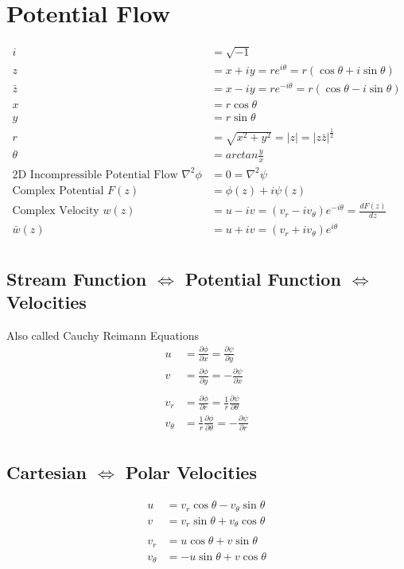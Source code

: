 \documentclass[10pt, letterpaper, notitlepage, landscape]{article}
\begin{document}
\section{Potential Flow}
\begin{align*}
i &= \sqrt{-1} \\
z &= x + i y = r e^{i \theta} = r (\cos{\theta} + i \sin{\theta}) \\
\bar{z} &= x - i y = r e^{-i \theta} = r (\cos{\theta} - i \sin{\theta}) \\
x &= r \cos{\theta} \\
y &= r \sin{\theta} \\
r &= \sqrt{x^2 + y^2} = |z| = |z \bar{z}|^{\frac{1}{2}} \\
\theta &= arctan{\frac{y}{x}} \\
\text{2D Incompressible Potential Flow } \nabla^2 \phi &= 0 = \nabla^2 \psi \\
\text{Complex Potential\ } F(z) &= \phi(z) + i \psi(z) \\
\text{Complex Velocity\ } w(z) &= u - i v = (v_r - i v_{\theta}) e^{-i \theta} = \frac{dF(z)}{dz} \\
\bar{w}(z) &= u + i v = (v_r + i v_{\theta}) e^{i \theta} \\
\end{align*}


\subsection{Stream Function $\Leftrightarrow$ Potential Function $\Leftrightarrow$ Velocities}
Also called Cauchy Reimann Equations
\begin{align*}
u &= \frac{\partial \phi}{\partial x} = \frac{\partial \psi}{\partial y} \\
v &= \frac{\partial \phi}{\partial y} = -\frac{\partial \psi}{\partial x} \\ \\
v_r &= \frac{\partial \phi}{\partial r} = \frac{1}{r} \frac{\partial \psi}{\partial \theta} \\
v_{\theta} &= \frac{1}{r} \frac{\partial \phi}{\partial \theta} = -\frac{\partial \psi}{\partial r} \\
\end{align*}

\subsection{Cartesian $\Leftrightarrow$ Polar Velocities}
\begin{align*}
u &= v_r \cos{\theta} - v_{\theta} \sin{\theta} \\
v &= v_r \sin{\theta} + v_{\theta} \cos{\theta} \\ \\
v_r &= u \cos{\theta} + v \sin{\theta} \\
v_{\theta} &= -u \sin{\theta} + v \cos{\theta} \\
\end{align*}
\end{document}
